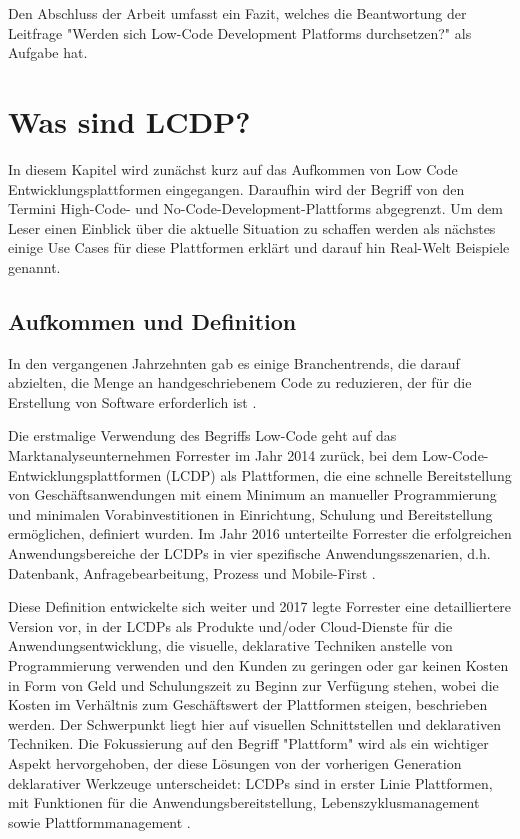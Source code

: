\documentclass[12pt]{article} %
\begin{document}
	Den Abschluss der Arbeit umfasst ein Fazit, welches die Beantwortung der Leitfrage "Werden sich Low-Code Development Platforms durchsetzen?" als Aufgabe hat. 
	
	\section{Was sind LCDP?}
	In diesem Kapitel wird zunächst kurz auf das Aufkommen von Low Code Entwicklungsplattformen eingegangen. Daraufhin wird der Begriff von den Termini High-Code- und No-Code-Development-Plattforms abgegrenzt. Um dem Leser einen Einblick über die aktuelle Situation zu schaffen werden als nächstes einige Use Cases für diese Plattformen erklärt und darauf hin Real-Welt Beispiele genannt. 
	
	\subsection{Aufkommen und Definition}		
	In den vergangenen Jahrzehnten gab es einige Branchentrends, die darauf abzielten, die Menge an handgeschriebenem Code zu reduzieren, der für die Erstellung von Software erforderlich ist \cite{DiRuscio.2022}. \newline
	
	Die erstmalige Verwendung des Begriffs Low-Code geht auf das Marktanalyseunternehmen Forrester im Jahr 2014 zurück, bei dem Low-Code-Entwicklungsplattformen (LCDP) als Plattformen, die eine schnelle Bereitstellung von Geschäftsanwendungen mit einem Minimum an manueller Programmierung und minimalen Vorabinvestitionen in Einrichtung, Schulung und Bereitstellung ermöglichen, definiert wurden. 
	Im Jahr 2016 unterteilte Forrester die erfolgreichen Anwendungsbereiche der LCDPs in vier spezifische Anwendungsszenarien, d.h. Datenbank, Anfragebearbeitung, Prozess und Mobile-First \cite{DiRuscio.2022}. \newline 
	
	Diese Definition entwickelte sich weiter und 2017 legte Forrester eine detailliertere Version vor, in der LCDPs als Produkte und/oder Cloud-Dienste für die Anwendungsentwicklung, die visuelle, deklarative Techniken anstelle von Programmierung verwenden und den Kunden zu geringen oder gar keinen Kosten in Form von Geld und Schulungszeit zu Beginn zur Verfügung stehen, wobei die Kosten im Verhältnis zum Geschäftswert der Plattformen steigen, beschrieben werden. 
	Der Schwerpunkt liegt hier auf visuellen Schnittstellen und deklarativen Techniken. Die Fokussierung auf den Begriff "Plattform" wird als ein wichtiger Aspekt hervorgehoben, der diese Lösungen von der vorherigen Generation deklarativer Werkzeuge unterscheidet: LCDPs sind in erster Linie Plattformen, mit Funktionen für die Anwendungsbereitstellung, Lebenszyklusmanagement sowie Plattformmanagement \cite{DiRuscio.2022}. \newline
	
\end{document}
